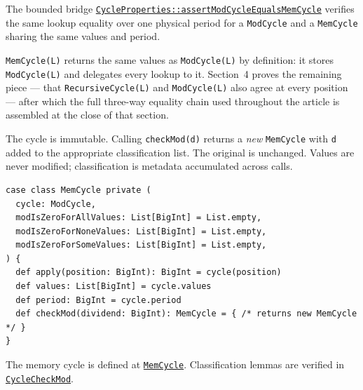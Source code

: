 The bounded bridge
\href{https://github.com/thiagomata/prime-numbers/blob/cycle-article-v1.0.0/src/main/scala/v1/chapter4/cycle/properties/CycleProperties.scala}{\texttt{CycleProperties::assertModCycleEqualsMemCycle}}
verifies the same lookup equality over one physical period for a
\texttt{ModCycle} and a \texttt{MemCycle} sharing the same values and period.

\texttt{MemCycle(L)} returns the same values as \texttt{ModCycle(L)} by
definition: it stores \texttt{ModCycle(L)} and delegates every lookup to it.
Section~4 proves the remaining piece --- that \texttt{RecursiveCycle(L)} and
\texttt{ModCycle(L)} also agree at every position --- after which the full
three-way equality chain used throughout the article is assembled at the close
of that section.

The cycle is immutable. Calling \texttt{checkMod(d)} returns a \emph{new}
\texttt{MemCycle} with \texttt{d} added to the appropriate classification
list. The original is unchanged. Values are never modified; classification is
metadata accumulated across calls.

\begin{lstlisting}[style=scala]
case class MemCycle private (
  cycle: ModCycle,
  modIsZeroForAllValues: List[BigInt] = List.empty,
  modIsZeroForNoneValues: List[BigInt] = List.empty,
  modIsZeroForSomeValues: List[BigInt] = List.empty,
) {
  def apply(position: BigInt): BigInt = cycle(position)
  def values: List[BigInt] = cycle.values
  def period: BigInt = cycle.period
  def checkMod(dividend: BigInt): MemCycle = { /* returns new MemCycle */ }
}
\end{lstlisting}

The memory cycle is defined at
\href{https://github.com/thiagomata/prime-numbers/blob/cycle-article-v1.0.0/src/main/scala/v1/chapter4/cycle/memory/MemCycle.scala}{\texttt{MemCycle}}.
Classification lemmas are verified in
\href{https://github.com/thiagomata/prime-numbers/blob/cycle-article-v1.0.0/src/main/scala/v1/chapter4/cycle/memory/properties/CycleCheckMod.scala}{\texttt{CycleCheckMod}}.
